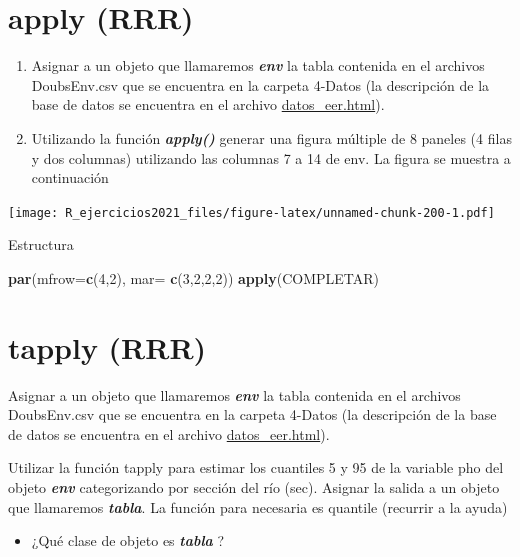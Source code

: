 \documentclass[]{book}
\newenvironment{Shaded}{\begin{snugshade}}{\end{snugshade}}
\newcommand{\DataTypeTok}[1]{\textcolor[rgb]{0.13,0.29,0.53}{#1}}
\newcommand{\DecValTok}[1]{\textcolor[rgb]{0.00,0.00,0.81}{#1}}
\newcommand{\KeywordTok}[1]{\textcolor[rgb]{0.13,0.29,0.53}{\textbf{#1}}}
\newcommand{\NormalTok}[1]{#1}
\providecommand{\tightlist}{%
  \setlength{\itemsep}{0pt}\setlength{\parskip}{0pt}}
\begin{document}
\hypertarget{apply-rrr}{%
\section{apply (RRR)}\label{apply-rrr}}

\begin{enumerate}
\def\labelenumi{\arabic{enumi}.}
\item
  Asignar a un objeto que llamaremos \textbf{\emph{env}} la tabla contenida en el archivos DoubsEnv.csv que se encuentra en la carpeta 4-Datos (la descripción de la base de datos se encuentra en el archivo \url{datos_eer.html}).
\item
  Utilizando la función \textbf{\emph{apply()}} generar una figura múltiple de 8 paneles (4 filas y dos columnas) utilizando las columnas 7 a 14 de env. La figura se muestra a continuación
\end{enumerate}

\texttt{[image: R\_ejercicios2021\_files/figure-latex/unnamed-chunk-200-1.pdf]}

Estructura

\begin{Shaded}
\begin{Highlighting}[]
\KeywordTok{par}\NormalTok{(}\DataTypeTok{mfrow=}\KeywordTok{c}\NormalTok{(}\DecValTok{4}\NormalTok{,}\DecValTok{2}\NormalTok{), }\DataTypeTok{mar=} \KeywordTok{c}\NormalTok{(}\DecValTok{3}\NormalTok{,}\DecValTok{2}\NormalTok{,}\DecValTok{2}\NormalTok{,}\DecValTok{2}\NormalTok{))}
\KeywordTok{apply}\NormalTok{(COMPLETAR)}
\end{Highlighting}
\end{Shaded}

\hypertarget{tapply-rrr}{%
\section{tapply (RRR)}\label{tapply-rrr}}

Asignar a un objeto que llamaremos \textbf{\emph{env}} la tabla contenida en el archivos DoubsEnv.csv que se encuentra en la carpeta 4-Datos (la descripción de la base de datos se encuentra en el archivo \url{datos_eer.html}).

Utilizar la función tapply para estimar los cuantiles 5 y 95 de la variable pho del objeto \textbf{\emph{env}} categorizando por sección del río (sec). Asignar la salida a un objeto que llamaremos \textbf{\emph{tabla}}. La función para necesaria es quantile (recurrir a la ayuda)

\begin{itemize}
\tightlist
\item
  ¿Qué clase de objeto es \textbf{\emph{tabla}} ?
\end{itemize}
\end{document}
